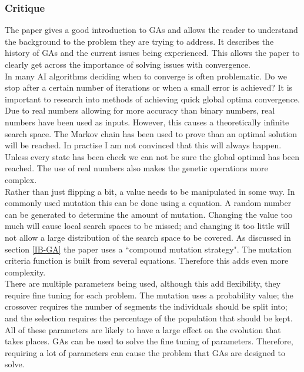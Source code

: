 \documentclass[10pt,a4paper,openbib]{article}
\begin{document}
\begin{multicols}{2}
\subsubsection{Critique}

The paper gives a good introduction to GAs and allows the reader to understand the background to the problem they are trying to address. It describes the history of GAs and the current issues being experienced. This allows the paper to clearly get across the importance of solving issues with convergence. \\

\noindent In many AI algorithms deciding when to converge is often problematic. Do we stop after a certain number of iterations or when a small error is achieved? It is important to research into methods of achieving quick global optima convergence. \\

\noindent Due to real numbers allowing for more accuracy than binary numbers, real numbers have been used as inputs. However, this causes a theoretically infinite search space. The Markov chain has been used to prove than an optimal solution will be reached.  In practise I am not convinced that this will always happen. Unless every state has been check we can not be sure the global optimal has been reached. The use of real numbers also makes the genetic operations more complex.\\

\noindent Rather than just flipping a bit, a value needs to be manipulated in some way. In commonly used mutation this can be done using a equation. A random number can be generated to determine the amount of mutation. Changing the value too much will cause local search spaces to be missed; and changing it too little will not allow a large distribution of the search space to be covered. As discussed in section \ref{IB-GA} the paper uses a ``compound mutation strategy". The mutation criteria function is built from several equations. Therefore this adds even more complexity. \\

\noindent There are multiple parameters being used, although this add flexibility, they require fine tuning for each problem. The mutation uses a probability value; the crossover requires the number of segments the individuals should be split into; and the selection requires the percentage of the population that should be kept. All of these parameters are likely to have a large effect on the evolution that takes places. GAs can be used to solve the fine tuning of parameters. Therefore, requiring a lot of parameters can cause the problem that GAs are designed to solve.\\


\end{multicols}
\end{document}

